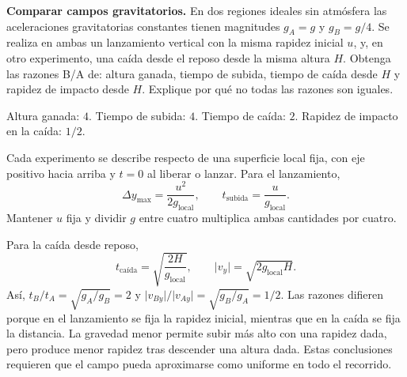 \begin{ejercicio}
\textbf{Comparar campos gravitatorios.} En dos regiones ideales sin atmósfera las aceleraciones gravitatorias constantes tienen magnitudes \(g_A=g\) y \(g_B=g/4\). Se realiza en ambas un lanzamiento vertical con la misma rapidez inicial \(u\), y, en otro experimento, una caída desde el reposo desde la misma altura \(H\). Obtenga las razones B/A de: altura ganada, tiempo de subida, tiempo de caída desde \(H\) y rapidez de impacto desde \(H\). Explique por qué no todas las razones son iguales.
\end{ejercicio}
\begin{respuesta}
Altura ganada: \(4\). Tiempo de subida: \(4\). Tiempo de caída: \(2\). Rapidez de impacto en la caída: \(1/2\).
\end{respuesta}
\begin{explicacion}
Cada experimento se describe respecto de una superficie local fija, con eje positivo hacia arriba y \(t=0\) al liberar o lanzar. Para el lanzamiento,
\[ \Delta y_{\max}=\frac{u^2}{2g_{\text{local}}},\qquad t_{\text{subida}}=\frac{u}{g_{\text{local}}}. \]
Mantener \(u\) fija y dividir \(g\) entre cuatro multiplica ambas cantidades por cuatro.

Para la caída desde reposo,
\[ t_{\text{caída}}=\sqrt{\frac{2H}{g_{\text{local}}}},\qquad \lvert v_y\rvert=\sqrt{2g_{\text{local}}H}. \]
Así, \(t_B/t_A=\sqrt{g_A/g_B}=2\) y \(\lvert v_{By}\rvert/\lvert v_{Ay}\rvert=\sqrt{g_B/g_A}=1/2\). Las razones difieren porque en el lanzamiento se fija la rapidez inicial, mientras que en la caída se fija la distancia. La gravedad menor permite subir más alto con una rapidez dada, pero produce menor rapidez tras descender una altura dada. Estas conclusiones requieren que el campo pueda aproximarse como uniforme en todo el recorrido.
\end{explicacion}

